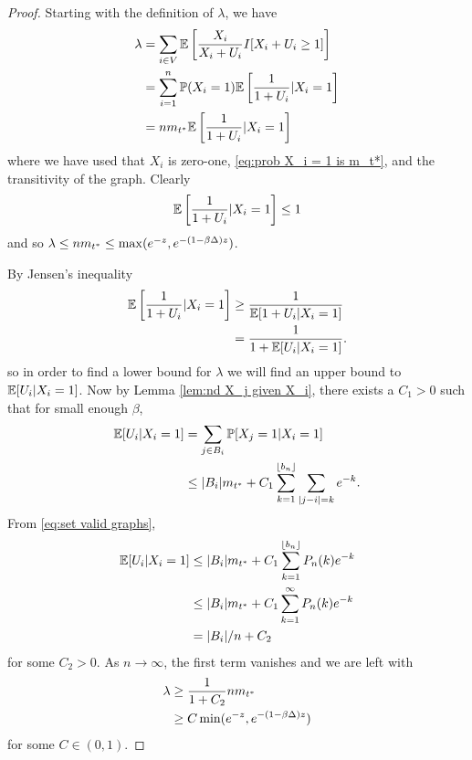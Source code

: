 	\begin{proof}
		Starting with the definition of $\lambda$, we have
		\begin{align}
			\lambda &= \sum_{i \in V} \mathbb{E}\left[\frac{X_i}{X_i + U_i} I[ X_i + U_i \geq 1] \right]\\
				&= \sum_{i = 1}^n \mathbb{P}(X_i = 1) \mathbb{E} \left[\frac{1}{1 + U_i}| X_i = 1\right]\\
				&= n m_{t^*} \mathbb{E} \left[\frac{1}{1 + U_i}| X_i = 1\right]
		\end{align}
		where we have used that $X_i$ is zero-one, \eqref{eq:prob X_i = 1 is m_t*}, and the transitivity of the graph.
		Clearly 
		\begin{align}
			\mathbb{E} \left[\frac{1}{1 + U_i}| X_i = 1\right] \leq 1
		\end{align}
		and so $\lambda \leq n m_{t^*} \leq \max(e^{-z}, e^{-(1 - \beta\Delta)z})$.

		By Jensen's inequality
		\begin{align}
			\mathbb{E} \left[\frac{1}{1 + U_i}| X_i = 1\right] &\geq \frac{1}{\mathbb{E}[1 + U_i | X_i = 1]}\\
				&= \frac{1}{1 + \mathbb{E}[U_i | X_i = 1]}.
		\end{align}
		so in order to find a lower bound for $\lambda$ we will find an upper bound to $\mathbb{E}[U_i | X_i = 1]$. Now by Lemma \ref{lem:nd X_j given X_i}, there exists a $C_1>0$ such that for small enough $\beta$,
		\begin{align}
			\mathbb{E}[U_i | X_i = 1] &= \sum_{j \in B_i} \mathbb{P}[X_j = 1| X_i = 1]\\
				& \leq |B_i| m_{t^*} + C_1\sum_{k=1}^{\lfloor b_n \rfloor} \sum_{|j - i| = k} e^{-k}.
		\end{align}
		From \eqref{eq:set valid graphs},
		\begin{align}
			\mathbb{E}[U_i | X_i = 1] &\leq |B_i|m_{t^*} + C_1 \sum_{k=1}^{\lfloor b_n \rfloor} P_n(k) e^{-k}\\
			&\leq |B_i|m_{t^*} + C_1 \sum_{k=1}^{\infty} P_n(k) e^{-k}\\
			&= |B_i|/n + C_2
		\end{align}
		for some $C_2 > 0$.
		As $n \rightarrow \infty$, the first term vanishes and we are left with \begin{align}
			\lambda &\geq \frac{1}{1 + C_2} n m_{t^*}\\
				&\geq C \min(e^{-z}, e^{-(1 - \beta\Delta)z}) 
		\end{align}
		for some $C \in (0, 1)$.
	\end{proof}

